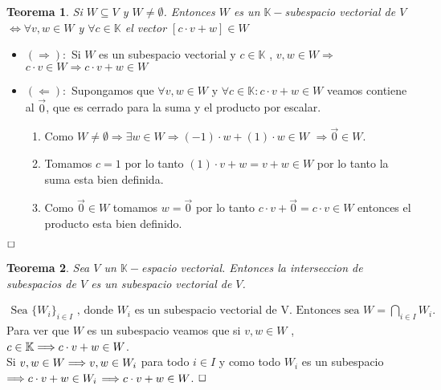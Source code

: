 \documentclass[]{article}
\newtheorem{theorem}{Teorema}
\newenvironment{proof}{\noindent{\bf Prueba:}}{$\hfill \Box$ \vspace{10pt}}
\begin{document}
\newpage

\begin{theorem}
    Si $W \subseteq V$ y $W\neq \emptyset$. Entonces $W$ es un $\mathbb{K}-$subespacio vectorial de $V$ $\iff \forall v,w \in W$
    y $\forall c \in \mathbb{K}$ el vector $[c \cdot v + w] \in W$ 
\end{theorem}
\begin{proof}
    \begin{itemize}
        \item $(\Longrightarrow):$ Si $W$ es un subespacio vectorial y $c \in \mathbb{K}$ , $v,w \in W \Longrightarrow$
        $c \cdot v \in W \Longrightarrow c \cdot v + w \in W$
        \item $(\Longleftarrow):$ Supongamos que $\forall v,w \in W$ y  $\forall c \in \mathbb{K} : c \cdot v + w \in W$ veamos contiene
        al $\vec{0}$, que es cerrado para la suma y el producto por escalar.
        \begin{enumerate}
            
            \item Como $W \neq \emptyset \Longrightarrow \exists w \in W \Longrightarrow (-1) \cdot w + (1) \cdot w \in W$
            $\Longrightarrow \vec{0} \in W$.
            \item Tomamos $c=1$ por lo tanto $(1) \cdot v + w = v + w \in W$ por lo tanto la suma esta bien definida.
            \item Como $\vec{0} \in W$ tomamos $w=\vec{0}$ por lo tanto $c \cdot v + \vec{0} = c \cdot v \in W$
            entonces el producto esta bien definido.
        \end{enumerate}
    \end{itemize}
\end{proof}

\begin{theorem}
    Sea $V$ un $\mathbb{K}-$espacio vectorial. Entonces la interseccion de subespacios de $V$ es un subespacio vectorial de $V$.
\end{theorem}
\begin{proof}
    \begin{align*}
        \text{Sea $\{ W_i \}_{i \in I}$ , donde $W_i$ es un subespacio vectorial de V. Entonces sea } W = \bigcap_{i \in I}W_i.
    \end{align*}
    Para ver que $W$ es un subespacio veamos que si $v,w \in W$ , $c \in \mathbb{K} \Longrightarrow c \cdot v + w \in W$.\\
    Si $v,w \in W \Longrightarrow v,w \in W_i$ para todo $i \in I$ y como todo $W_i$ es un subespacio $\Longrightarrow c \cdot v + w \in W_i$
    $\Longrightarrow c \cdot v + w \in W$.
\end{proof}
\end{document}
